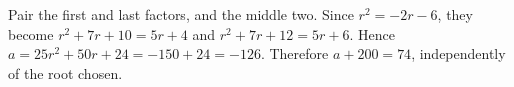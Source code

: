Pair the first and last factors, and the middle two. Since $r^2=-2r-6$, they become $r^2+7r+10=5r+4$ and $r^2+7r+12=5r+6$. Hence $a=25r^2+50r+24=-150+24=-126$. Therefore $a+200=\boxed{74}$, independently of the root chosen.
